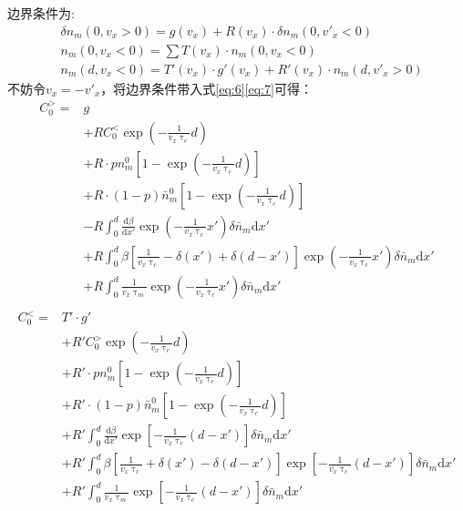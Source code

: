\documentclass{article}
\begin{document}
	边界条件为:
	\begin{equation}\label{eq:9}
	\begin{aligned}
	&\delta n_m(0,v_x>0)=g(v_x)+R(v_x)\cdot \delta n_m(0,v'_x<0)	\\
	&n_m(0,v_x<0)=\sum T(v_x)\cdot n_m(0,v_x<0)\\
	&n_m(d,v_x<0)=T'(v_x)\cdot g'(v_x)+R'(v_x)\cdot n_m(d,v'_x>0)
	\end{aligned}
	\end{equation}
	不妨令$v_x=-v'_x$，将边界条件带入式\eqref{eq:6}\eqref{eq:7}可得：
	\begin{equation}\label{eq:10}
		\begin{aligned}
		C_0^>=&g\\
			&+RC_0^<\exp(-\frac{1}{v_x\uptau_c}d)\\
			&+R\cdot pn^0_m[1-\exp(-\frac{1}{v_x\uptau_c}d)]\\
			&+R\cdot (1-p)\bar{n}^0_m[1-\exp(-\frac{1}{v_x\uptau_c}d)]\\
			&-R\int_0^d\frac{\mathrm{d}\beta}{\mathrm{d}x'}\exp(-\frac{1}{v_x\uptau_{c}}x')\delta\bar{n}_m\mathrm{d}x'\\
			&+R\int_0^d\beta[\frac{1}{v_x\uptau_c}-\delta(x')+\delta(d-x')]\exp(-\frac{1}{v_x\uptau_{c}}x')\delta\bar{n}_m\mathrm{d}x'\\
			&+R\int_0^d\frac{1}{v_x\uptau_m}\exp(-\frac{1}{v_x\uptau_{c}}x')\delta\bar{n}_m\mathrm{d}x'\\			
		\end{aligned}
	\end{equation}
	\begin{equation}\label{eq:11}
		\begin{aligned}
		C_0^<=&T'\cdot g'\\
			&+R'C_0^>\exp(-\frac{1}{v_x\uptau_c}d)\\
			&+R'\cdot pn^0_m[1-\exp(-\frac{1}{v_x\uptau_c}d)]\\
			&+R'\cdot (1-p)\bar{n}^0_m[1-\exp(-\frac{1}{v_x\uptau_c}d)]\\
			&+R'\int_0^d\frac{\mathrm{d}\beta}{\mathrm{d}x'}\exp[-\frac{1}{v_x\uptau_{c}}(d-x')]\delta\bar{n}_m\mathrm{d}x'\\
			&+R'\int_0^d\beta[\frac{1}{v_x\uptau_c}+\delta(x')-\delta(d-x')]\exp[-\frac{1}{v_x\uptau_{c}}(d-x')]\delta\bar{n}_m\mathrm{d}x'\\
			&+R'\int_0^d\frac{1}{v_x\uptau_m}\exp[-\frac{1}{v_x\uptau_{c}}(d-x')]\delta\bar{n}_m\mathrm{d}x'\\			
		\end{aligned}
	\end{equation}
\end{document}
